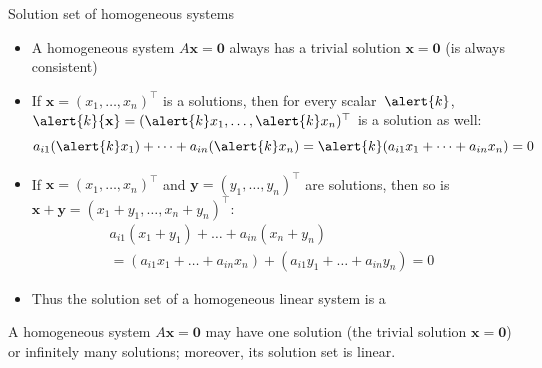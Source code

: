 \documentclass%
[handout]%
{beamer}
\newcommand{\bx}{{\mathbf x}}
\newcommand{\by}{{\mathbf y}}
\begin{document}
\begin{frame}[label=homogeneous]{Solution set of homogeneous systems}

\vspace*{-10pt}

\begin{itemize}
  \item A homogeneous system $A \bx = \mathbf{0}$ always has a \alert{trivial solution} $\bx = \mathbf{0}$ (is always consistent)
  \item If $\bx=(x_1,\dots,x_n)^\top$ is a solutions, then for every scalar~$\alert{k}$, $\alert{k}\bx=(\alert{k}x_1,\dots,\alert{k}x_n)^\top$ is a solution as well:\\[-20pt]
      \[  %
          a_{i1}(\alert{k}x_1) %
            + \dots + a_{in}(\alert{k}x_n)
          = \alert{k}(a_{i1}x_1 %
            + \dots + a_{in}x_n) = 0
      \]  %
  \item If $\bx = (x_1,\dots,x_n)^\top$ and $\by = (y_1,\dots,y_n)^\top$   are solutions, then so is $\bx+\by = (x_1 + y_1 , \dots,x_n + y_n)^\top$:\\[-20pt]
    \begin{multline*}
          a_{i1}(x_1 + y_1) +  \dots + a_{in}(x_n+y_n)\\
          = (a_{i1}x_1 +  \dots + a_{in}x_n) +
           (a_{i1}y_1 +  \dots + a_{in}y_n) = 0
    \end{multline*}
  \item Thus the \alert{solution set} of a homogeneous linear system is a 
\end{itemize}
\begin{theorem}
  A homogeneous system $A \bx = \mathbf{0}$ may have one solution (the {trivial solution} $\bx=\mathbf{0}$) or infinitely many solutions; moreover, its solution set is linear.
\end{theorem}
\end{frame}

\end{document}
